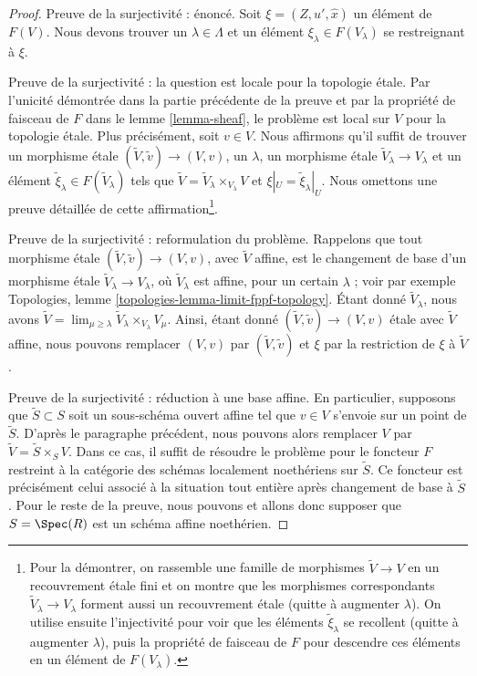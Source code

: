 \begin{proof}
\medskip\noindent
Preuve de la surjectivité : énoncé.
Soit $\xi = (Z, u', \hat x)$ un élément de $F(V)$. Nous devons trouver un
$\lambda \in \Lambda$ et un élément $\xi_\lambda \in F(V_\lambda)$ se
restreignant à $\xi$.

\medskip\noindent
Preuve de la surjectivité : la question est locale pour la topologie \'etale.
Par l'unicité démontrée dans la partie précédente de la preuve et par la
propriété de faisceau de $F$ dans le lemme \ref{lemma-sheaf}, le problème est
local sur $V$ pour la topologie \'etale. Plus précisément, soit $v \in V$.
Nous affirmons qu'il suffit de trouver un morphisme \'etale
$(\tilde V, \tilde v) \to (V, v)$, un
$\lambda$, un morphisme \'etale $\tilde V_\lambda \to V_\lambda$ et un élément
$\tilde \xi_\lambda \in F(\tilde V_\lambda)$ tels que
$\tilde V = \tilde V_\lambda \times_{V_\lambda} V$
et $\xi|_U = \tilde \xi_\lambda|_U$. Nous omettons une preuve détaillée de
cette affirmation\footnote{Pour la démontrer, on rassemble une famille de
morphismes $\tilde V \to V$ en un recouvrement \'etale fini et on montre que
les morphismes correspondants $\tilde V_\lambda \to V_\lambda$ forment aussi
un recouvrement \'etale (quitte à augmenter $\lambda$). On utilise ensuite
l'injectivité pour voir que les éléments $\tilde \xi_\lambda$ se recollent
(quitte à augmenter $\lambda$), puis la propriété de faisceau de $F$ pour
descendre ces éléments en un élément de $F(V_\lambda)$.}.

\medskip\noindent
Preuve de la surjectivité : reformulation du problème.
Rappelons que tout morphisme \'etale $(\tilde V, \tilde v) \to (V, v)$, avec
$\tilde V$ affine, est le changement de base d'un morphisme \'etale
$\tilde V_\lambda \to V_\lambda$, où $\tilde V_\lambda$ est affine, pour un
certain $\lambda$ ; voir par exemple Topologies, lemme
\ref{topologies-lemma-limit-fppf-topology}. Étant donné $\tilde V_\lambda$,
nous avons
$\tilde V = \lim_{\mu \geq \lambda} \tilde V_\lambda \times_{V_\lambda} V_\mu$.
Ainsi, étant donné $(\tilde V, \tilde v) \to (V, v)$ \'etale avec $\tilde V$
affine, nous pouvons remplacer $(V, v)$ par $(\tilde V, \tilde v)$ et $\xi$
par la restriction de $\xi$ à $\tilde V$.

\medskip\noindent
Preuve de la surjectivité : réduction à une base affine. En particulier,
supposons que $\tilde S \subset S$ soit un sous-schéma ouvert affine tel que
$v \in V$ s'envoie sur un point de $\tilde S$. D'après le paragraphe
précédent, nous pouvons alors remplacer $V$ par
$\tilde V = \tilde S \times_S V$. Dans ce cas, il suffit
de résoudre le problème pour le foncteur $F$ restreint à la catégorie des
schémas localement noethériens sur $\tilde S$. Ce foncteur est précisément
celui associé à la situation tout entière après changement de base à
$\tilde S$. Pour le reste de la preuve, nous pouvons et allons donc supposer
que $S = \Spec(R)$ est un schéma affine noethérien.


\end{proof}
